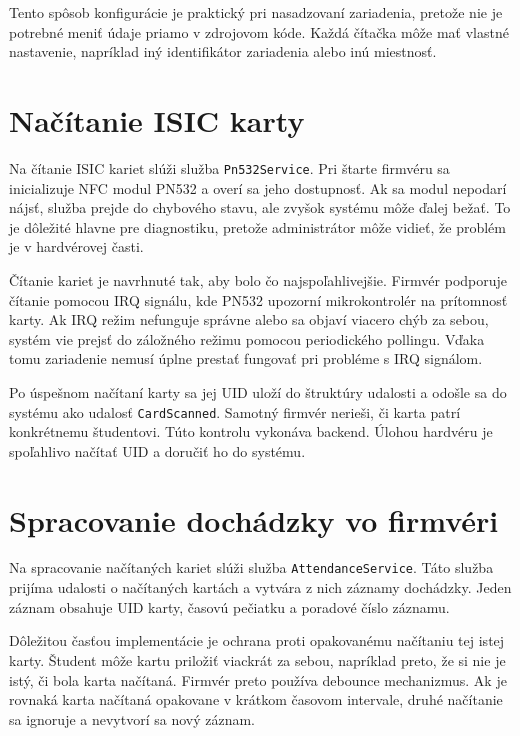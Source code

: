 Tento spôsob konfigurácie je praktický pri nasadzovaní zariadenia, pretože nie je potrebné meniť údaje priamo v zdrojovom kóde. Každá čítačka môže mať vlastné nastavenie, napríklad iný identifikátor zariadenia alebo inú miestnosť.

\section{Načítanie ISIC karty}
\label{subsec:card-reading}

Na čítanie ISIC kariet slúži služba \texttt{Pn532Service}. Pri štarte firmvéru sa inicializuje NFC modul PN532 a overí sa jeho dostupnosť. Ak sa modul nepodarí nájsť, služba prejde do chybového stavu, ale zvyšok systému môže ďalej bežať. To je dôležité hlavne pre diagnostiku, pretože administrátor môže vidieť, že problém je v hardvérovej časti.

Čítanie kariet je navrhnuté tak, aby bolo čo najspoľahlivejšie. Firmvér podporuje čítanie pomocou IRQ signálu, kde PN532 upozorní mikrokontrolér na prítomnosť karty. Ak IRQ režim nefunguje správne alebo sa objaví viacero chýb za sebou, systém vie prejsť do záložného režimu pomocou periodického pollingu. Vďaka tomu zariadenie nemusí úplne prestať fungovať pri probléme s IRQ signálom.

Po úspešnom načítaní karty sa jej UID uloží do štruktúry udalosti a odošle sa do systému ako udalosť \texttt{CardScanned}. Samotný firmvér nerieši, či karta patrí konkrétnemu študentovi. Túto kontrolu vykonáva backend. Úlohou hardvéru je spoľahlivo načítať UID a doručiť ho do systému.

\section{Spracovanie dochádzky vo firmvéri}
\label{subsec:attendance-processing-firmware}

Na spracovanie načítaných kariet slúži služba \texttt{AttendanceService}. Táto služba prijíma udalosti o načítaných kartách a vytvára z nich záznamy dochádzky. Jeden záznam obsahuje UID karty, časovú pečiatku a poradové číslo záznamu.

Dôležitou časťou implementácie je ochrana proti opakovanému načítaniu tej istej karty. Študent môže kartu priložiť viackrát za sebou, napríklad preto, že si nie je istý, či bola karta načítaná. Firmvér preto používa debounce mechanizmus. Ak je rovnaká karta načítaná opakovane v krátkom časovom intervale, druhé načítanie sa ignoruje a nevytvorí sa nový záznam.

